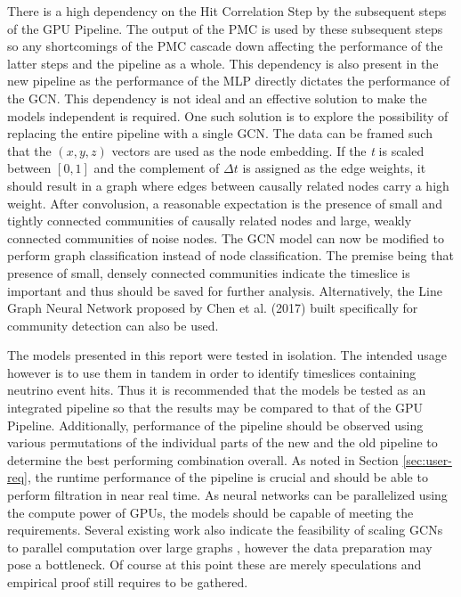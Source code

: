 There is a high dependency on the Hit Correlation Step by the
subsequent steps of the GPU Pipeline. The output of the PMC is used by
these subsequent steps so any shortcomings of the PMC cascade down
affecting the performance of the latter steps and the pipeline as a
whole. This dependency is also present in the new pipeline as the
performance of the MLP directly dictates the performance of the GCN.
This dependency is not ideal and an effective solution to make the
models independent is required. One such solution is to explore the
possibility of replacing the entire pipeline with a single GCN. The
data can be framed such that the $(x, y, z)$ vectors are used as the
node embedding. If the \emph{t} is scaled between $[0, 1]$ and the
complement of $\Delta t$ is assigned as the edge weights, it should
result in a graph where edges between causally related nodes carry a
high weight. After convolusion, a reasonable expectation is the
presence of small and tightly connected communities of causally
related nodes and large, weakly connected communities of noise nodes.
The GCN model can now be modified to perform graph classification
\cite{zhang2018end} instead of node classification. The premise being
that presence of small, densely connected communities indicate the
timeslice is important and thus should be saved for further analysis.
Alternatively, the Line Graph Neural Network proposed by Chen et al.
(2017) built specifically for community detection can also be used.

The models presented in this report were tested in isolation. The
intended usage however is to use them in tandem in order to identify
timeslices containing neutrino event hits. Thus it is recommended that
the models be tested as an integrated pipeline so that the results may
be compared to that of the GPU Pipeline. Additionally, performance of
the pipeline should be observed using various permutations of the
individual parts of the new and the old pipeline to determine the best
performing combination overall. As noted in Section
\ref{sec:user-req}, the runtime performance of the pipeline is crucial
and should be able to perform filtration in near real time. As neural
networks can be parallelized using the compute power of GPUs, the
models should be capable of meeting the requirements. Several existing
work also indicate the feasibility of scaling GCNs to parallel
computation over large graphs \cite{ma2019high, ma2019neugraph,
  zeng2019accurate}, however the data preparation may pose a
bottleneck. Of course at this point these are merely speculations and
empirical proof still requires to be gathered.


